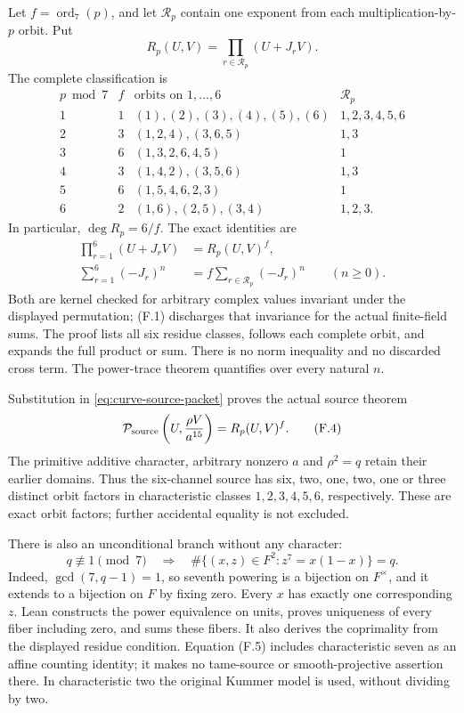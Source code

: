 \documentclass[11pt]{article}
\begin{document}
Let $f=\operatorname{ord}_7(p)$, and let $\mathcal R_p$ contain one
exponent from each multiplication-by-$p$ orbit. Put
\[
 R_p(U,V)=\prod_{r\in\mathcal R_p}(U+J_rV).
\]
The complete classification is
\[
\begin{array}{c|c|l|l}
p\bmod7&f&\text{orbits on }1,\ldots,6&\mathcal R_p\\ \hline
1&1&(1),(2),(3),(4),(5),(6)&1,2,3,4,5,6\\
2&3&(1,2,4),(3,6,5)&1,3\\
3&6&(1,3,2,6,4,5)&1\\
4&3&(1,4,2),(3,5,6)&1,3\\
5&6&(1,5,4,6,2,3)&1\\
6&2&(1,6),(2,5),(3,4)&1,2,3 .
\end{array}
\]
In particular, $\deg R_p=6/f$. The exact identities are
\begin{align}
 \prod_{r=1}^6(U+J_rV)&=R_p(U,V)^f, \tag{F.2}\\
 \sum_{r=1}^6(-J_r)^n&=
 f\sum_{r\in\mathcal R_p}(-J_r)^n\qquad(n\ge0). \tag{F.3}
\end{align}
Both are kernel checked for arbitrary complex values invariant under
the displayed permutation; (F.1) discharges that invariance for the
actual finite-field sums. The proof lists all six residue classes,
follows each complete orbit, and expands the full product or sum.
There is no norm inequality and no discarded cross term.
The power-trace theorem quantifies over every natural $n$.

Substitution in \eqref{eq:curve-source-packet} proves the actual
source theorem
\begin{equation}
 {\cal P}_{\rm source}\left(U,\frac{\rho V}{a^{15}}\right)
       =R_p(U,V)^f .
 \tag{F.4}
\end{equation}
The primitive additive character, arbitrary nonzero $a$ and
$\rho^2=q$ retain their earlier domains. Thus the six-channel
source has six, two, one, two, one or three distinct orbit factors
in characteristic classes $1,2,3,4,5,6$, respectively. These are
exact orbit factors; further accidental equality is not excluded.

There is also an unconditional branch without any character:
\begin{equation}
 q\not\equiv1\pmod7
 \quad\Longrightarrow\quad
 \#\{(x,z)\in F^2:z^7=x(1-x)\}=q .
 \tag{F.5}
\end{equation}
Indeed, $\gcd(7,q-1)=1$, so seventh powering is a bijection on
$F^\times$, and it extends to a bijection on $F$ by fixing zero.
Every $x$ has exactly one corresponding $z$. Lean constructs the
power equivalence on units, proves uniqueness of every fiber
including zero, and sums these fibers. It also derives the
coprimality from the displayed residue condition.
Equation (F.5) includes characteristic seven as an affine counting
identity; it makes no tame-source or smooth-projective assertion
there. In characteristic two the original Kummer model is used,
without dividing by two.
\end{document}
